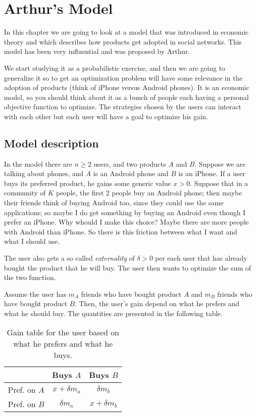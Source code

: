 \chapter{Arthur's Model}

In this chapter we are going to look at a model that was introduced in economic theory and which describes how products get adopted in social networks. This model has been very influential and was proposed by Arthur.

We start studying it as a probabilistic exercise, and then we are going to generalize it so to get an optimization problem will have some relevance in the adoption of products (think of iPhone versus Android phones). It is an economic model, so you should think about it as a bunch of people each having a personal objective function to optimize. The strategies chosen by the users can interact with each other but each user will have a goal to optimize his gain.

\section{Model description}
In the model there are $n \geq 2$ users, and two products $A$ and $B$. Suppose we are talking about phones, and $A$ is an Android phone and $B$ is an iPhone. If a user buys its preferred product, he gains some generic value $x > 0$. Suppose that in a community of $K$ people, the first 2 people buy an Android phone; then maybe their friends think of buying Android too, since they could use the same applications; so maybe I do get something by buying an Android even though I prefer an iPhone. Why whould I make this choice? Maybe there are more people with Android than iPhone. So there is this friction between what I want and what I should use. 

The user also gets a so called \emph{externality} of $\delta > 0$ per each user that has already bought the product that he will buy. The user then wants to optimize the sum of the two function.

Assume the user has $m_A$ friends who have bought product $A$ and $m_B$ friends who have bought product $B$. Then, the user's gain depend on what he prefers and what he should buy. The quantities are presented in the following table.
\begin{table}[h!]
	\centering
	\begin{tabular}{|c|c|c|}
		\hline
		& Buys $A$ & Buys $B$\\\hline
		Pref. on $A$ & $x + \delta{m_a}$ & $\delta{m_b}$\\\hline
		Pref. on $B$ & $\delta{m_a}$ & $x + \delta{m_b}$\\\hline
	\end{tabular}
	\caption{Gain table for the user based on what he prefers and what he buys.}
\end{table}

